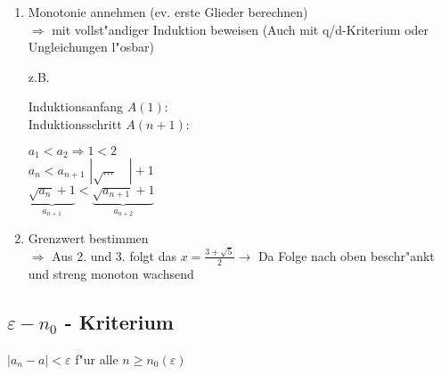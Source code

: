 \begin{flushleft}
\begin{enumerate}
	\item Monotonie annehmen (ev. erste Glieder berechnen)\\
		$\Rightarrow$ mit vollst"andiger Induktion beweisen (Auch mit q/d-Kriterium oder Ungleichungen l"osbar)\\
			\begin{minipage}[t]{20cm}
				\begin{minipage}[t]{1cm}
					z.B.
				\end{minipage}
				\begin{minipage}[t]{5cm}
					Induktionsanfang $A(1)$:\\
					Induktionsschritt $A(n+1)$:\\
				\end{minipage}
				\begin{minipage}[t]{15cm}
					$a_1 < a_2 \Rightarrow 1 < 2 $\\
					$a_n < a_{n+1}$ \hspace{5cm}$|\sqrt{...}\quad |+1$\\
					$\underbrace{\sqrt{a_n}+1}_{a_{n+1}} < \underbrace{\sqrt{a_{n+1}}+1}_{a_{n+2}}$\\
				\end{minipage}   

			\end{minipage}  
            \item Grenzwert bestimmen\\
		$\Rightarrow$ Aus 2. und 3. folgt das $x=\frac{3+\sqrt{5}}{2}\rightarrow$ Da Folge nach oben beschr"ankt und streng monoton wachsend
\end{enumerate}
					



\subsection{$\varepsilon - n_0$ - Kriterium}
	$|a_n - a| < \varepsilon$ f"ur alle $n \geq n_0(\varepsilon)$

\end{flushleft}
